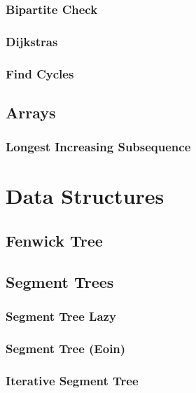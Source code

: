 \documentclass[twocolumn, landscape]{report}
\begin{document}
            \subsection{Bipartite Check}
            
            \subsection{Dijkstras}
            
            \subsection{Find Cycles}
            

        \section{Arrays}
            \subsection{Longest Increasing Subsequence}
            

    \chapter*{Data Structures}
        \section{Fenwick Tree}
        
        \section{Segment Trees}
            \subsection{Segment Tree Lazy}
            
            \subsection{Segment Tree (Eoin)}
            
            \subsection{Iterative Segment Tree}
            
\end{document}
